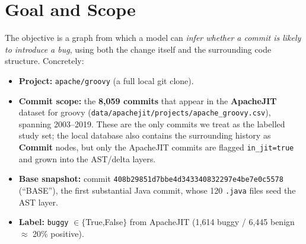 \documentclass[11pt,a4paper]{article}
\newcommand{\code}[1]{\texttt{#1}}
\newcommand{\node}[1]{\textcolor{kgblue}{\textbf{#1}}}
\begin{document}
\begin{abstract}
		Finally, \textbf{V3} finalizes the graph and delivers its headline contribution.
		It executes the remediation --- most notably correcting a large \emph{ghost-AST}
		inflation ($\approx$1.58\,M nodes, $\approx$55\% of the ``alive'' AST, left by
		package-restructuring renames outside the labelled commit set), driving the
		standing integrity audit to a clean state --- and introduces the \textbf{Commit
		Semantic-Text Graph (CSTG)}: a theoretically-grounded third layer that models each
		commit's text (message $+$ diff) as a graph (graph-of-words/TW-IDF, an NPMI term
		co-occurrence graph, defect-typing, cross-modal grounding to the AST) and is
		enriched with an online recency/bug-cache signal. On the controlled split the CSTG
		\emph{beats the strongest text baseline} (RF ROC $0.827$ vs.\ $0.813$), and under
		the fully-online protocol it lifts the deployed KG fusion to ROC $0.838$ / PR-AUC
		$0.628$ / MCC $0.467$ --- dominating every baseline on Precision, Macro-F1, G-Mean
		and MCC. After a redundancy audit (dropping subsumed features and edges), the
		clean final predictor is a genuinely multimodal, provably-clean, fully-online
		commit KG. Remaining work --- a heterogeneous GNN and cross-project reproducibility
		--- is scoped to V4.
	\end{abstract}
	
	\tableofcontents
	\bigskip
	
	\section{Goal and Scope}
	The objective is a graph from which a model can \emph{infer whether a commit is
		likely to introduce a bug}, using both the change itself and the surrounding
	code structure. Concretely:
	
	\begin{itemize}[nosep]
		\item \textbf{Project:} \texttt{apache/groovy} (a full local git clone).
		\item \textbf{Commit scope:} the \textbf{8{,}059 commits} that appear in the
		\textbf{ApacheJIT} dataset for groovy
		(\texttt{data/apachejit/projects/apache\_groovy.csv}), spanning
		2003--2019. These are the only commits we treat as the labelled study
		set; the local database also contains the surrounding history as
		\node{Commit} nodes, but only the ApacheJIT commits are flagged
		\code{in\_jit=true} and grown into the AST/delta layers.
		\item \textbf{Base snapshot:} commit
		\texttt{408b29851d7bbe4d343340832297e4be7e0c5578} (``BASE''), the first
		substantial Java commit, whose 120 \texttt{.java} files seed the AST
		layer.
		\item \textbf{Label:} \texttt{buggy} $\in\{$True,False$\}$ from ApacheJIT
		(1{,}614 buggy / 6{,}445 benign $\approx$ 20\% positive).
	\end{itemize}
	
\end{document}
